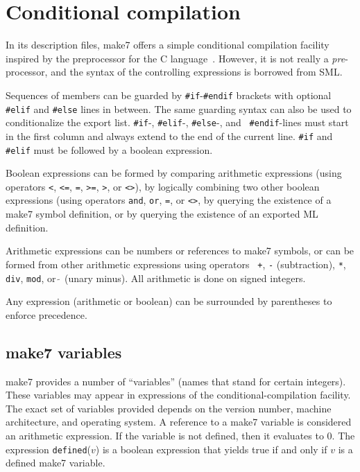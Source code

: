
\section{Conditional compilation}
\label{sec:preproc}

In its description files, make7 offers a simple conditional compilation
facility inspired by the preprocessor for the C language~\cite{k&r2}.
However, it is not really a {\it pre}-processor, and the syntax of the
controlling expressions is borrowed from SML.

Sequences of members can be guarded by {\tt \#if}-{\tt \#endif}
brackets with optional {\tt \#elif} and {\tt \#else} lines in between.
The same guarding syntax can also be used to conditionalize the export
list.  {\tt \#if}-, {\tt \#elif}-, {\tt \#else}-, and {\tt
\#endif}-lines must start in the first column and always
extend to the end of the current line.  {\tt \#if} and {\tt \#elif}
must be followed by a boolean expression.

Boolean expressions can be formed by comparing arithmetic expressions
(using operators {\tt <}, {\tt <=}, {\tt =}, {\tt >=}, {\tt >}, or
{\tt <>}), by logically combining two other boolean expressions (using
operators {\tt and}, {\tt or}, {\tt =}, or {\tt <>}, by
querying the existence of a make7 symbol definition, or by querying the
existence of an exported ML definition.

Arithmetic expressions can be numbers or references to make7 symbols, or
can be formed from other arithmetic expressions using operators {\tt
+}, {\tt -} (subtraction), \verb|*|, {\tt div}, {\tt mod}, or $\tilde{~}$
(unary minus).  All arithmetic is done on signed integers.

Any expression (arithmetic or boolean) can be surrounded by
parentheses to enforce precedence.

\subsection{make7 variables}
\label{sec:cmvars}

make7 provides a number of ``variables'' (names that stand for certain
integers). These variables may appear in expressions of the
conditional-compilation facility. The exact set of variables provided
depends on the version number, machine architecture, and
operating system.  A reference to a make7 variable is considered an
arithmetic expression. If the variable is not defined, then it
evaluates to 0.  The expression {\tt defined}($v$) is a boolean
expression that yields true if and only if $v$ is a defined make7
variable.

